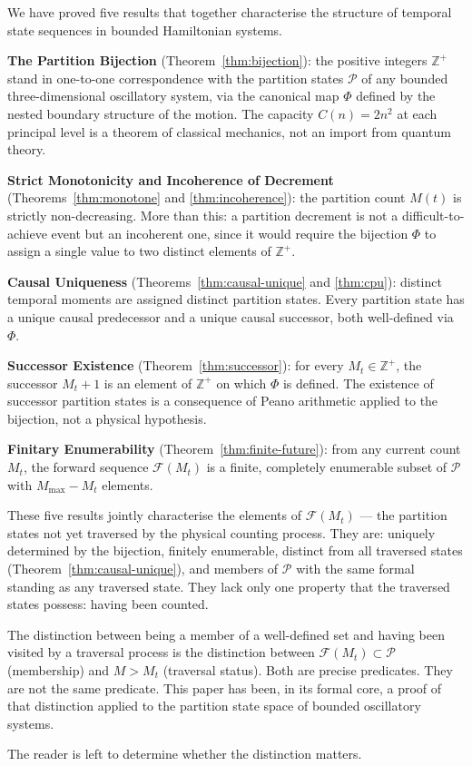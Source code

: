 \documentclass[twocolumn,10pt,a4paper]{article}
\theoremstyle{thmstyle}
\theoremstyle{definition}
\theoremstyle{remark}
\newcommand{\Zp}{\mathbb{Z}^{+}}
\newcommand{\Parts}{\mathcal{P}}
\newcommand{\Mmax}{M_{\max}}
\newcommand{\PhiMap}{\varPhi}
\begin{document}
We have proved five results that together characterise the structure of temporal state sequences in bounded Hamiltonian systems.

\textbf{The Partition Bijection} (Theorem~\ref{thm:bijection}): the positive integers $\Zp$ stand in one-to-one correspondence with the partition states $\Parts$ of any bounded three-dimensional oscillatory system, via the canonical map $\PhiMap$ defined by the nested boundary structure of the motion. The capacity $C(n) = 2n^2$ at each principal level is a theorem of classical mechanics, not an import from quantum theory.

\textbf{Strict Monotonicity and Incoherence of Decrement} (Theorems~\ref{thm:monotone} and \ref{thm:incoherence}): the partition count $M(t)$ is strictly non-decreasing. More than this: a partition decrement is not a difficult-to-achieve event but an incoherent one, since it would require the bijection $\PhiMap$ to assign a single value to two distinct elements of $\Zp$.

\textbf{Causal Uniqueness} (Theorems~\ref{thm:causal-unique} and \ref{thm:cpu}): distinct temporal moments are assigned distinct partition states. Every partition state has a unique causal predecessor and a unique causal successor, both well-defined via $\PhiMap$.

\textbf{Successor Existence} (Theorem~\ref{thm:successor}): for every $M_t \in \Zp$, the successor $M_t + 1$ is an element of $\Zp$ on which $\PhiMap$ is defined. The existence of successor partition states is a consequence of Peano arithmetic applied to the bijection, not a physical hypothesis.

\textbf{Finitary Enumerability} (Theorem~\ref{thm:finite-future}): from any current count $M_t$, the forward sequence $\mathcal{F}(M_t)$ is a finite, completely enumerable subset of $\Parts$ with $\Mmax - M_t$ elements.

These five results jointly characterise the elements of $\mathcal{F}(M_t)$ --- the partition states not yet traversed by the physical counting process. They are: uniquely determined by the bijection, finitely enumerable, distinct from all traversed states (Theorem~\ref{thm:causal-unique}), and members of $\Parts$ with the same formal standing as any traversed state. They lack only one property that the traversed states possess: having been counted.

The distinction between being a member of a well-defined set and having been visited by a traversal process is the distinction between $\mathcal{F}(M_t) \subset \Parts$ (membership) and $M > M_t$ (traversal status). Both are precise predicates. They are not the same predicate. This paper has been, in its formal core, a proof of that distinction applied to the partition state space of bounded oscillatory systems.

The reader is left to determine whether the distinction matters.



\end{document}
